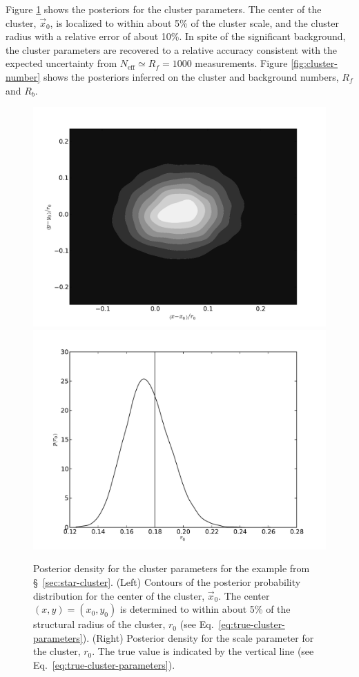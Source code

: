 \documentclass[aps,prd,reprint,nofootinbib]{revtex4-1}
\begin{document}
Figure \ref{fig:cluster-params} shows the posteriors for the cluster
parameters.  The center of the cluster, $\vec{x}_0$, is localized to
within about 5\% of the cluster scale, and the cluster radius with a
relative error of about 10\%.  In spite of the significant background,
the cluster parameters are recovered to a relative accuracy consistent
with the expected uncertainty from $N_\mathrm{eff} \simeq R_f = 1000$
measurements.  Figure \ref{fig:cluster-number} shows the posteriors
inferred on the cluster and background numbers, $R_f$ and $R_b$.

\begin{figure}
  \includegraphics[width=0.4\columnwidth]{sky_location}\includegraphics[width=0.4\columnwidth]{scale}
  \caption{\label{fig:cluster-params} Posterior density for the
    cluster parameters for the example from \S~\ref{sec:star-cluster}.
    (Left) Contours of the posterior probability distribution for the
    center of the cluster, $\vec{x}_0$.  The center $(x,y) =
    \left(x_0, y_0\right)$ is determined to within about 5\% of the
    structural radius of the cluster, $r_0$ (see
    Eq.~\eqref{eq:true-cluster-parameters}).  (Right) Posterior
    density for the scale parameter for the cluster, $r_0$.  The true
    value is indicated by the vertical line (see
    Eq.~\ref{eq:true-cluster-parameters}).}
\end{figure}
\end{document}
